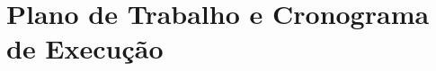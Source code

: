 \documentclass[
    12pt,               %
    a4paper,            %
    english,            %
    brazil,             %
    ]{article}
\begin{document}
\section{Plano de Trabalho e Cronograma de Execução}








\end{document}

